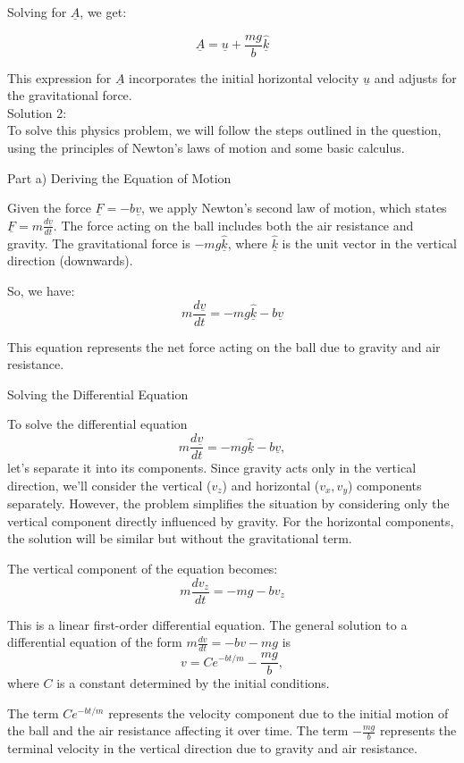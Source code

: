 \documentclass[a4paper,11pt]{article}
\begin{document}
Solving for \( \underline{A} \), we get:

\[ \underline{A} = \underline{u} + \frac{mg}{b}\hat{\underline{k}} \]

This expression for \( \underline{A} \) incorporates the initial horizontal velocity \( \underline{u} \) and adjusts for the gravitational force. \\

\noindent Solution 2: \\

To solve this physics problem, we will follow the steps outlined in the question, using the principles of Newton's laws of motion and some basic calculus.

Part a) Deriving the Equation of Motion

Given the force \( \underline{F} = - b \underline{v} \), we apply Newton's second law of motion, which states \( \underline{F} = m \frac{d\underline{v}}{dt} \). The force acting on the ball includes both the air resistance and gravity. The gravitational force is \( -mg \hat{\underline{k}} \), where \( \hat{\underline{k}} \) is the unit vector in the vertical direction (downwards).

So, we have:
\[
m\frac{d\underline{v}}{dt} = -mg\hat{\underline{k}} - b\underline{v}
\]

This equation represents the net force acting on the ball due to gravity and air resistance.

Solving the Differential Equation

To solve the differential equation
\[
m\frac{d\underline{v}}{dt} = -mg\hat{\underline{k}} - b\underline{v},
\]
let's separate it into its components. Since gravity acts only in the vertical direction, we'll consider the vertical (\(v_z\)) and horizontal (\(v_x, v_y\)) components separately. However, the problem simplifies the situation by considering only the vertical component directly influenced by gravity. For the horizontal components, the solution will be similar but without the gravitational term.

The vertical component of the equation becomes:
\[
m\frac{dv_z}{dt} = -mg - bv_z
\]

This is a linear first-order differential equation. The general solution to a differential equation of the form \(m\frac{dv}{dt} = -bv - mg\) is
\[
v = Ce^{-bt/m} - \frac{mg}{b},
\]
where \(C\) is a constant determined by the initial conditions.

The term \(Ce^{-bt/m}\) represents the velocity component due to the initial motion of the ball and the air resistance affecting it over time. The term \(-\frac{mg}{b}\) represents the terminal velocity in the vertical direction due to gravity and air resistance.
\end{document}
